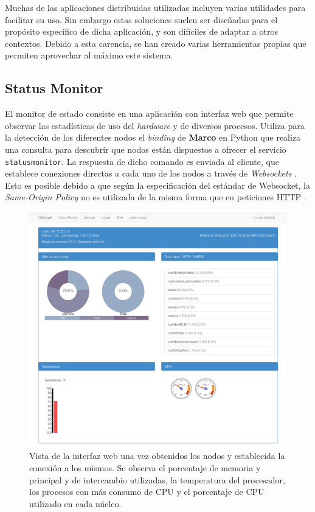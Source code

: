 Muchas de las aplicaciones distribuidas utilizadas incluyen varias utilidades para facilitar su uso. Sin embargo estas soluciones suelen ser diseñadas para el propósito específico de dicha aplicación, y son difíciles de adaptar a otros contextos. Debido a esta carencia, se han creado varias herramientas propias que permiten aprovechar al máximo este sistema.

\subsection{Status Monitor}

El monitor de estado consiste en una aplicación con interfaz web que permite observar las estadísticas de uso del \textit{hardware} y de diversos procesos. Utiliza para la detección de los diferentes nodos el \textit{binding} de \textbf{Marco} en Python que realiza una consulta para descubrir que nodos están dispuestos a ofrecer el servicio \texttt{statusmonitor}. La respuesta de dicho comando es enviada al cliente, que establece conexiones directas a cada uno de los nodos a través de \textit{Websockets} \cite{rfc6455}. Esto es posible debido a que según la especificación del estándar de Websocket, la \textit{Same-Origin Policy} no es utilizada de la misma forma que en peticiones HTTP \cite{rfc6454}.


\begin{figure}[H]
	\centering
	\includegraphics[height=0.5\textheight]{Chapters/Chapter5/Figures/screenshot-statusmonitor}
	\caption[Vista de la interfaz web de \textbf{Statusmonitor} una vez obtenidos los nodos]{Vista de la interfaz web una vez obtenidos los nodos y establecida la conexión a los mismos. Se observa el porcentaje de memoria y principal y de intercambio utilizadas, la temperatura del procesador, los procesos con más consumo de CPU y el porcentaje de CPU utilizado en cada núcleo.}
	\label{fig:vista_statusmonitor}
\end{figure}

